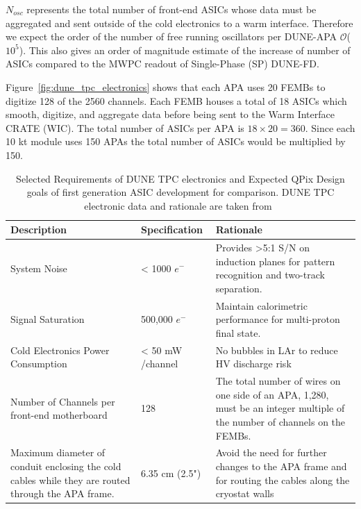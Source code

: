 $N_{osc}$ represents the total number of front-end ASICs whose data must be aggregated and sent outside of the cold electronics to a warm interface.
Therefore we expect the order of the number of free running oscillators per DUNE-APA $\mathcal{O}$($10^5$).
This also gives an order of magnitude estimate of the increase of number of ASICs compared to the MWPC readout of Single-Phase (SP) DUNE-FD.

Figure~\ref{fig:dune_tpc_electronics} shows that each APA uses 20 FEMBs to digitize 128 of the 2560 channels.
Each FEMB houses a total of 18 ASICs which smooth, digitize, and aggregate data before being sent to the Warm Interface CRATE (WIC).
The total number of ASICs per APA is $18\times 20 = 360$.
Since each 10 kt module uses 150 APAs the total number of ASICs would be multiplied by 150.

\begin{table}
\begin{center}
\begin{tabular}{|| p{50mm} | p{50mm} | p{50mm} ||}
 \hline
 Description & Specification & Rationale \\ [0.5ex]
 \hline\hline
  System Noise & < 1000 $e^{-}$ & Provides >5:1 S/N on induction planes for pattern recognition and two-track separation. \\
 \hline
  Signal Saturation & 500,000 $e^{-}$ & Maintain calorimetric performance for multi-proton final state. \\
 \hline
  Cold Electronics Power Consumption & < 50 \unit{mW} /channel & No bubbles in LAr to reduce HV discharge risk\\
 \hline
  Number of Channels per front-end motherboard & 128 &  The total number of wires on one side of an APA, 1,280, must be an integer multiple of the number of channels on the FEMBs. \\
 \hline
Maximum diameter of conduit enclosing the cold cables while they are routed through the APA frame. & 6.35 cm (2.5") & Avoid the need for further changes to the APA frame and for routing the cables along the cryostat walls \\
 \hline
\end{tabular}
\caption{Selected Requirements of DUNE TPC electronics and Expected QPix Design goals of first generation ASIC development for comparison. DUNE TPC electronic data and rationale are taken from~\citep{DUNE-FD_TDRv4:Abi_2020.}}
\end{center}
\end{table}

